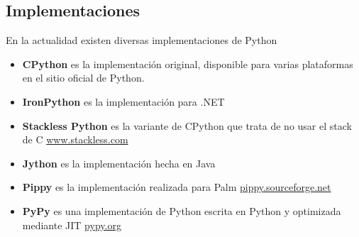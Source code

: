 \subsection{Implementaciones}

En la actualidad existen diversas implementaciones de Python

\begin{itemize}
    \item {\bfseries CPython} es la implementación original, disponible para varias plataformas en el sitio oficial de Python.
    \item {\bfseries IronPython} es la implementación para .NET
    \item {\bfseries Stackless Python} es la variante de CPython que trata de no usar el stack de C \url{www.stackless.com}
    \item {\bfseries Jython} es la implementación hecha en Java
    \item {\bfseries Pippy} es la implementación realizada para Palm \url{pippy.sourceforge.net}
    \item {\bfseries PyPy} es una implementación de Python escrita en Python y optimizada mediante JIT \url{pypy.org}
\end{itemize}
